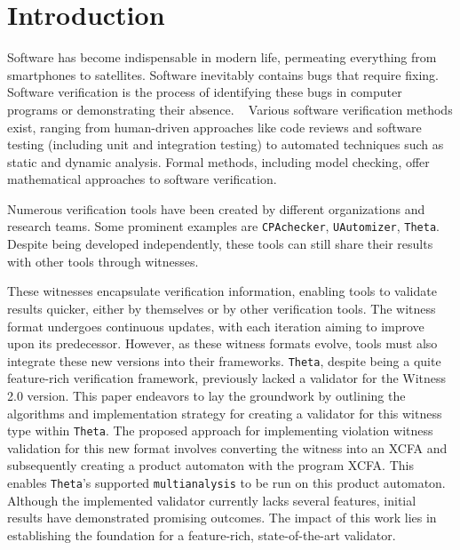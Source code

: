\chapter{Introduction}

Software has become indispensable in modern life, permeating everything from smartphones to 
satellites. Software inevitably contains bugs that require fixing. Software verification is 
the process of identifying these bugs in computer programs or demonstrating their absence. ~\cite{witness2} 
Various software verification methods exist, ranging from human-driven approaches like code 
reviews and software testing (including unit and integration testing) to automated techniques 
such as static and dynamic analysis. Formal methods, including model checking, offer mathematical 
approaches to software verification.

Numerous verification tools have been created by different organizations and research teams. 
Some prominent examples are \texttt{CPAchecker}, \texttt{UAutomizer}, \texttt{Theta}.
Despite being developed independently, these tools can still share their results with other tools
through witnesses.

These witnesses encapsulate verification information, enabling tools to validate results quicker,
either by themselves or by other verification tools. The witness format undergoes
continuous updates, with each iteration aiming to improve upon its predecessor. However, as
these witness formats evolve, tools must also integrate these new versions into their frameworks.
\texttt{Theta}, despite being a quite feature-rich verification framework, previously lacked a
validator for the Witness 2.0 version. This paper endeavors to lay the groundwork by outlining
the algorithms and implementation strategy for creating a validator for this witness type
within \texttt{Theta}. The proposed approach for implementing violation witness validation for
this new format involves converting the witness into an XCFA and subsequently
creating a product automaton with the program XCFA. This enables \texttt{Theta}'s
supported \texttt{multianalysis} to be run on this product automaton. Although the implemented
validator currently lacks several features, initial results have demonstrated promising outcomes.
The impact of this work lies in establishing the foundation for a feature-rich,
state-of-the-art validator.

